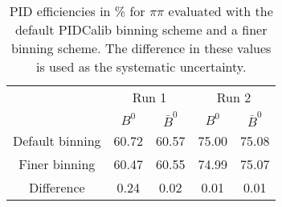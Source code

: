 \begin{table}
    \centering
    \begin{tabular}{ccccc}
    \toprule
& \multicolumn{2}{c}{Run 1} & \multicolumn{2}{c}{Run 2}\\
& $B^0$ & $\bar{B}^0$ & $B^0$ & $\bar{B}^0$\\
    \midrule
Default binning & 60.72 & 60.57 & 75.00 & 75.08\\
Finer binning & 60.47 & 60.55 & 74.99 & 75.07\\
Difference & 0.24 & 0.02 & 0.01 & 0.01\\
    \bottomrule
    \end{tabular}
    \caption{PID efficiencies in \% for $\pi\pi$ evaluated with the default PIDCalib binning scheme and a finer binning scheme. The difference in these values is used as the systematic uncertainty.}
\label{tab:final_PID_pipi}
\end{table}
